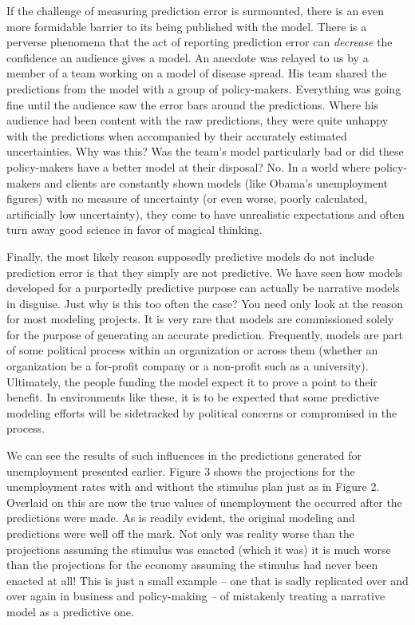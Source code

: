 \documentclass[]{memoir}
\begin{document}
If the challenge of measuring prediction error is surmounted, there is
an even more formidable barrier to its being published with the model.
There is a perverse phenomena that the act of reporting prediction error
can \emph{decrease} the confidence an audience gives a model. An
anecdote was relayed to us by a member of a team working on a model of
disease spread. His team shared the predictions from the model with a
group of policy-makers. Everything was going fine until the audience saw
the error bars around the predictions. Where his audience had been
content with the raw predictions, they were quite unhappy with the
predictions when accompanied by their accurately estimated
uncertainties. Why was this? Was the team's model particularly bad or
did these policy-makers have a better model at their disposal? No. In a
world where policy-makers and clients are constantly shown models (like
Obama's unemployment figures) with no measure of uncertainty (or even
worse, poorly calculated, artificially low uncertainty), they come to
have unrealistic expectations and often turn away good science in favor
of magical thinking.

Finally, the most likely reason supposedly predictive models do not
include prediction error is that they simply are not predictive. We have
seen how models developed for a purportedly predictive purpose can
actually be narrative models in disguise. Just why is this too often the
case? You need only look at the reason for most modeling projects. It is
very rare that models are commissioned solely for the purpose of
generating an accurate prediction. Frequently, models are part of some
political process within an organization or across them (whether an
organization be a for-profit company or a non-profit such as a
university). Ultimately, the people funding the model expect it to prove
a point to their benefit. In environments like these, it is to be
expected that some predictive modeling efforts will be sidetracked by
political concerns or compromised in the process.

We can see the results of such influences in the predictions generated
for unemployment presented earlier. Figure 3 shows the projections for
the unemployment rates with and without the stimulus plan just as in
Figure 2. Overlaid on this are now the true values of unemployment the
occurred after the predictions were made. As is readily evident, the
original modeling and predictions were well off the mark. Not only was
reality worse than the projections assuming the stimulus was enacted
(which it was) it is much worse than the projections for the economy
assuming the stimulus had never been enacted at all! This is just a
small example -- one that is sadly replicated over and over again in
business and policy-making -- of mistakenly treating a narrative model
as a predictive one.
\end{document}
